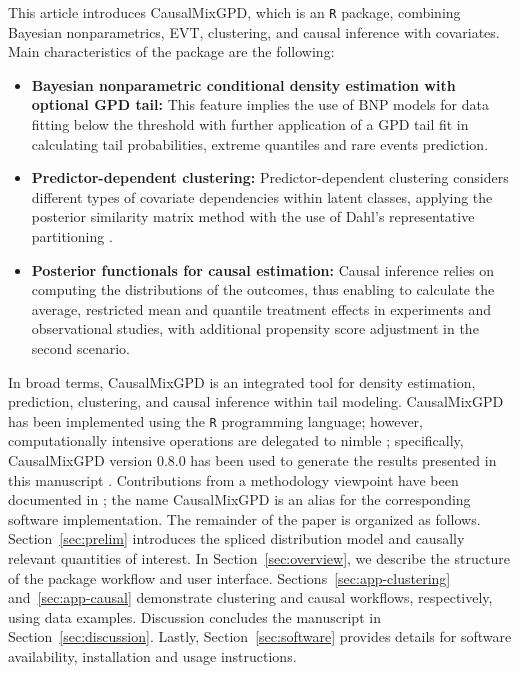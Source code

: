 \documentclass[11pt]{article}\usepackage[]{graphicx}\usepackage[]{xcolor}
\newcommand{\pkg}[1]{\textsf{#1}}
\newcommand{\proglang}[1]{\texttt{#1}}
\begin{document}
This article introduces \pkg{CausalMixGPD}, which is an \proglang{R} package,
combining Bayesian nonparametrics, EVT, clustering,
and causal inference with covariates. Main characteristics of the package are the following:

\begin{itemize}
  \item[(i)] \textbf{Bayesian nonparametric conditional density estimation with optional GPD tail:} This feature implies the use of BNP models for data fitting below the threshold with further application of a GPD tail fit in calculating tail probabilities, extreme quantiles and rare events prediction.

  \item[(ii)] \textbf{Predictor-dependent clustering:} Predictor-dependent clustering considers different types of covariate dependencies within latent classes, applying the posterior similarity matrix method with the use of Dahl's representative partitioning \citep{Binder1978,Dahl2006}.

  \item[(iii)] \textbf{Posterior functionals for causal estimation:} Causal inference relies on computing the distributions of the outcomes, thus enabling to calculate the average, restricted mean and quantile treatment effects in experiments and observational studies, with additional propensity score adjustment in the second scenario.
\end{itemize}

In broad terms, \pkg{CausalMixGPD} is an integrated tool for density
estimation, prediction, clustering, and causal inference within tail modeling.
\pkg{CausalMixGPD} has been implemented using the \proglang{R} programming
language; however, computationally intensive operations are delegated to
\pkg{nimble} \citep{nimble_method,nimble_pkg}; specifically, \pkg{CausalMixGPD} version
0.8.0 has been used to generate the results presented
in this manuscript \citep{CausalMixGPD_pkg}.
Contributions from a methodology viewpoint have been documented in
\citet{Aich2026ExtremeCQTE}; the name \pkg{CausalMixGPD} is an alias for
the corresponding software implementation.
The remainder of the paper is organized as follows.
Section~\ref{sec:prelim} introduces the spliced distribution model
and causally relevant quantities of interest.
In Section~\ref{sec:overview}, we describe the structure of the package
workflow and user interface.
Sections~\ref{sec:app-clustering} and~\ref{sec:app-causal} demonstrate
clustering and causal workflows, respectively, using data examples.
Discussion concludes the manuscript in Section~\ref{sec:discussion}.
Lastly, Section~\ref{sec:software}  provides details for
software availability, installation and usage instructions.
\end{document}
